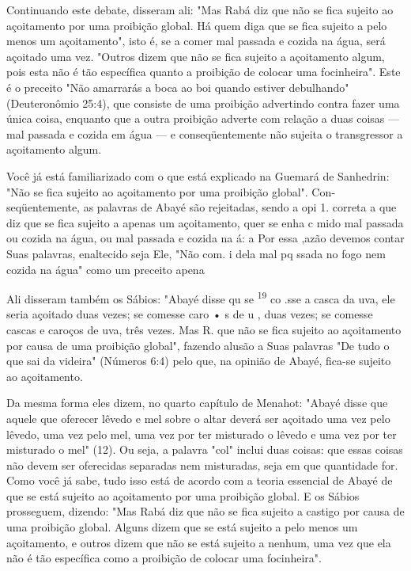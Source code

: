 \begin{itemize}
\begin{enumrate}
Continuando este debate, disseram ali: "Mas Rabá diz que não se fi­ca
sujeito ao açoitamento por uma proibição global. Há quem diga que se
fica sujeito a pelo menos um açoitamento", isto é, se a comer mal
passada e cozida na água, será açoitado uma vez. "Outros dizem que não
se fica sujeito a açoita­mento algum, pois esta não é tão específica
quanto a proibição de colocar uma focinheira". Este é o preceito "Não
amarrarás a boca ao boi quando estiver de­bulhando" (Deuteronômio 25:4),
que consiste de uma proibição advertindo con­tra fazer uma única coisa,
enquanto que a outra proibição adverte com relação a duas coisas --- mal
passada e cozida em água --- e conseqüentemente não su­jeita o
transgressor a açoitamento algum.

Você já está familiarizado com o que está explicado na Guemará de
Sanhedrin: "Não se fica sujeito ao açoitamento por uma proibição
global". Con­seqüentemente, as palavras de Abayé são rejeitadas, sendo a
opi 1. correta a que diz que se fica sujeito a apenas um açoitamento,
quer se enha c mido mal passada ou cozida na água, ou mal passada e
cozida na á: a Por essa ,azão devemos contar Suas palavras, enaltecido
seja Ele, "Não com. i dela mal pq ssa­da no fogo nem
cozida na água" como um preceito apena

Ali disseram também os Sábios: "Abayé disse qu se \textsuperscript{19}
co .sse a casca da uva, ele seria açoitado duas vezes;
se comesse caro • s de u , duas vezes; se comesse cascas e caroços de
uva, três vezes. Mas R. que não se fica sujeito ao açoitamento por causa
de uma proibição global", fazendo alu­são a Suas palavras "De tudo o que
sai da videira" (Números 6:4) pelo que, na opinião de Abayé, fica-se
sujeito ao açoitamento.

Da mesma forma eles dizem, no quarto capítulo de Menahot: "Aba­yé disse
que aquele que oferecer lêvedo e mel sobre o altar deverá ser açoitado
uma vez pelo lêvedo, uma vez pelo mel, uma vez por ter misturado o
lêvedo e uma vez por ter misturado o mel" (12). Ou seja, a palavra "col"
inclui duas coisas: que essas coisas não devem ser oferecidas separadas
nem misturadas, seja em que quantidade for. Como você já sabe, tudo isso
está de acordo com a teoria essencial de Abayé de que se está sujeito ao
açoitamento por uma proi­bição global. E os Sábios prosseguem, dizendo:
"Mas Rabá diz que não se fica sujeito a castigo por causa de uma
proibição global. Alguns dizem que se está sujeito a pelo menos um
açoitamento, e outros dizem que não se está sujeito a nenhum, uma vez
que ela não é tão específica como a proibição de colocar uma
focinheira".


\end{enumrate}
\end{itemize}
